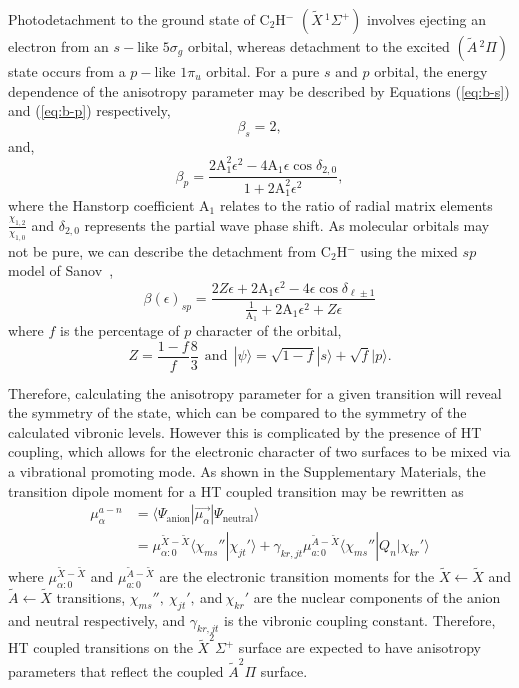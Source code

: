 \documentclass[journal=jpcafh,manuscript=article,layout=onecolumn, 12pt]{achemso}
\begin{document}
Photodetachment to the ground state of C$_2$H$^-$ $(\tilde{X}\,^1\Sigma^+)$ involves ejecting an electron from an $s-$like $5\sigma_g$ orbital, whereas detachment to the excited $(\tilde{A}\,^2\Pi)$ state occurs from a $p-$like $1\pi_u$ orbital.  For a pure $s$ and $p$ orbital, the energy dependence of the anisotropy parameter may be described by Equations (\ref{eq:b-s}) and (\ref{eq:b-p}) respectively,
\begin{equation}
\beta_s = 2,
\label{eq:b-s}
\end{equation}
and,
\begin{equation}
\beta_p = \frac{2\text{A}_1^2\epsilon^2-4\text{A}_1\epsilon\cos\delta_{2,0}}{1+2\text{A}_1^2\epsilon^2},
\label{eq:b-p}
\end{equation}
where the Hanstorp coefficient A$_1$ relates to the ratio of radial matrix elements $\frac{\chi_{1,2}}{\chi_{1,0}}$ and $\delta_{2,0}$ represents the partial wave phase shift. As molecular orbitals may not be pure, we can describe the detachment from C$_2$H$^-$ using the mixed $sp$ model of Sanov~\cite{san14},
\begin{equation}
\beta(\epsilon)_{sp} = \frac{2Z\epsilon+2\text{A}_1\epsilon^2-4\epsilon\cos\delta_{\ell\pm 1}}{\frac{1}{\text{A}_1}+2\text{A}_1\epsilon^2+Z\epsilon}
\label{eq:beta-sanov}
\end{equation}  
where $f$ is the percentage of $p$ character of the orbital,
\begin{equation}
Z = \frac{1-f}{f}\frac{8}{3}~~ \text{and} ~~ |\psi\rangle = \sqrt{1-f}|s\rangle + \sqrt{f}|p\rangle.
\end{equation}

Therefore, calculating the anisotropy parameter for a given transition will reveal the symmetry of the state, which can be compared to the symmetry of the calculated vibronic levels. However this is complicated by the presence of HT coupling, which allows for the electronic character of two surfaces to be mixed via a vibrational promoting mode. As shown in the Supplementary Materials, the transition dipole moment for a HT coupled transition may be rewritten as
\begin{align}
\mu_{\alpha}^{a-n} &= \langle \Psi_{\text{anion}}|\vec{\mu_{\alpha}}|\Psi_{\text{neutral}}\rangle\\
&= \mu_{\alpha:0}^{\tilde{X}-\tilde{X}}\langle\chi_{ms}''|\chi_{jt}'\rangle+\gamma_{kr,jt}\mu_{a:0}^{\tilde{A}-\tilde{X}}\langle\chi_{ms}''|Q_n|\chi_{kr}'\rangle
\label{eq:1}
\end{align}  
where $\mu_{\alpha:0}^{\tilde{X}-\tilde{X}}$ and $\mu_{a:0}^{\tilde{A}-\tilde{X}}$ are the electronic transition moments for the $\tilde{X}\leftarrow\tilde{X}$ and $\tilde{A}\leftarrow\tilde{X}$ transitions, $\chi_{ms}'',~\chi_{jt}',~$and$~\chi_{kr}'$ are the nuclear components of the anion and neutral respectively, and $\gamma_{kr,jt}$ is the vibronic coupling constant. Therefore, HT coupled transitions on the $\tilde{X}^2\Sigma^+$ surface are expected to have anisotropy parameters that reflect the coupled $\tilde{A}^2\Pi$ surface.
\end{document}
